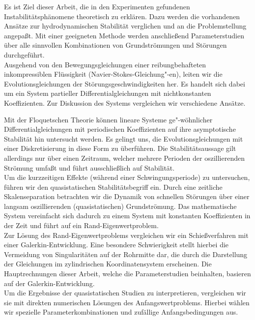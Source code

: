 \documentclass[10pt,a5paper,oneside,draft]{book}
\numberwithin{equation}{chapter}
\begin{document}
Es ist Ziel dieser Arbeit, die in den Experimenten gefundenen Instabilit\"atsph\"anomene theoretisch zu erkl\"aren.
Dazu werden die vorhandenen Ans\"atze zur hydrodynamischen Stabilit\"at verglichen und an die Problemstellung angepa\ss t.
Mit einer geeigneten Methode werden anschlie\ss end Parameterstudien \"uber alle sinnvollen Kombinationen von Grundstr\"omungen und St\"orungen durchgef\"uhrt.\\

Ausgehend von den Bewegungsgleichungen einer reibungbehafteten inkompressiblen Fl\"ussigkeit (Navier-Stokes-Gleichung"-en), leiten wir die Evolutionsgleichungen der St\"orungsgeschwindigkeiten her.
Es handelt sich dabei um ein System partieller Differentialgleichungen mit nichtkonstanten Koeffizienten.
Zur Diskussion des Systems vergleichen wir verschiedene Ans\"atze.

Mit der Floquetschen Theorie k\"onnen lineare Systeme ge"-w\"ohnlicher Differentialgleichungen mit periodischen Koeffizienten auf ihre asymptotische Stabilit\"at hin untersucht werden.
Es gelingt uns, die Evolutionsgleichungen mit einer Diskretisierung in diese Form zu \"uberf\"uhren.
Die Stabilit\"atsaussage gilt allerdings nur \"uber einen Zeitraum, welcher mehrere Perioden der oszillierenden Str\"omung umfa\ss t und f\"uhrt ausschlie\ss lich auf Stabilit\"at.\\
Um die kurzzeitigen Effekte (w\"ahrend einer Schwingungsperiode) zu untersuchen, f\"uhren wir den quasistatischen Stabilit\"atsbegriff ein.
Durch eine zeitliche Skalenseparation betrachten wir die Dynamik von schnellen St\"orungen \"uber einer langsam oszillierenden (quasistatischen) Grundstr\"omung.
Das mathematische System vereinfacht sich dadurch zu einem System mit konstanten Koeffizienten in der Zeit und f\"uhrt auf ein Rand-Eigenwertproblem.\\
Zur L\"osung des Rand-Eigenwertproblems vergleichen wir ein Schie\ss verfahren mit einer Galerkin-Entwicklung.
Eine besondere Schwierigkeit stellt hierbei die Vermeidung von Singularit\"aten auf der Rohrmitte dar, die durch die Darstellung der Gleichungen im zylindrischen Koordinatensystem erscheinen.
Die Hauptrechnungen dieser Arbeit, welche die Parameterstudien beinhalten, basieren auf der Galerkin-Entwicklung.\\
Um die Ergebnisse der quasistatischen Studien zu interpretieren, vergleichen wir sie mit direkten numerischen L\"osungen des Anfangswertproblems.
Hierbei w\"ahlen wir spezielle Parameterkombinationen und zuf\"allige Anfangsbedingungen aus.\\
\end{document}
